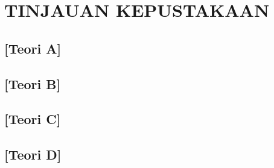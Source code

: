 %
%
\chapter{TINJAUAN KEPUSTAKAAN}


\section{[Teori A]}

\section{[Teori B]}

\section{[Teori C]}

\section{[Teori D]}


